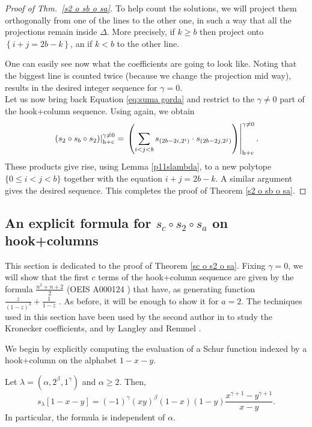 \documentclass[twoside]{article}
\renewcommand{\hcN}[1]{\left.\left(#1\right)\right|_{\textnormal{h+c}}^{\gamma\ne0}}
\begin{document}
\begin{proof}[Proof of Thm.~\ref{s2 o sb o sa}]
To help count the solutions, we will project them orthogonally from one of the lines to the other one, in such a way that all the projections remain inside $\Delta$. More precisely, if $k\ge b$ then project onto $\left\{i+j=2b-k\right\}$, an if $k<b$ to the other line.

One can easily see now what the coefficients are going to look like. Noting that the biggest line is counted twice (because we change the projection mid way), results in the desired integer sequence for $\gamma=0$.\\

Let us now bring back Equation \eqref{eq:suma gorda} and restrict to the $\gamma\ne0$ part of the hook+column sequence. Using \cite[Thm.~4.8 (3)]{langley} again, we obtain
\[
\hcN{s_2\circ s_b\circ s_2} = \hcN{\sum_{i<j<b} s_{(2b-2i,2^i)}\cdot s_{(2b-2j,2^j)}}.
\]
These products give rise, using Lemma \ref{p11slambda}, to a new polytope $\{0\le i< j< b\}$ together with the equation $i+j=2b-k$. A similar argument gives the desired sequence. This completes the proof of Theorem  \ref{s2 o sb o sa}.
\end{proof}


\subsection{An explicit formula for \texorpdfstring{$s_c\circ s_2\circ s_a$}{sc o s2 o sa} on hook+columns} \label{scs2sa}

This section is dedicated to the proof of Theorem \ref{sc o s2 o sa}. Fixing $\gamma=0$, we will show that the first $c$ terms of the hook+column sequence are given by the formula $\frac{n^2+n+2}{2}$ (OEIS A000124 \cite{oeis}) that have, as  generating function $\frac{z}{(1-z)^3}+\frac{1}{1-z}$ \cite{plouffe}. As before, it will be enough to show it for $a=2$. The techniques used in this section have been used by the second author in \cite{rosas} to study the Kronecker coefficients, and by Langley and Remmel \cite{langley}.

We begin by explicitly computing the evaluation of a Schur function indexed by a hook+column on the alphabet $1-x-y$.

\begin{lem}\label{slambda en 1-x-y} Let $\lambda=(\alpha, 2^\beta, 1^\gamma)$ and $\alpha\ge2$. Then,
\[
s_{\lambda}[1-x-y] =(-1)^\gamma (xy)^\beta (1-x)(1-y)\frac{x^{\gamma+1}-y^{\gamma+1}}{x-y}.
\]
In particular, the formula is independent of $\alpha$.
\end{lem}
\end{document}
